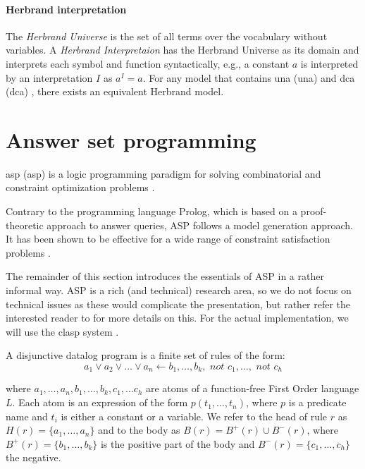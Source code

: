 \paragraph{Herbrand interpretation} The \textit{Herbrand Universe} is the set of all terms over the vocabulary without variables. A \textit{Herbrand Interpretaion} has the Herbrand Universe as its domain and interprets each symbol and function syntactically, e.g., a constant $a$ is interpreted by an interpretation $I$ as $a^I = a$. For any model that contains \acrlong{una} (\acrshort{una}) \parencite{UNA} and \acrlong{dca} (\acrshort{dca}) \parencite{DCA}, there exists an equivalent Herbrand model.


\section{Answer set programming}
\acrlong{asp} (\acrshort{asp}) is a logic programming paradigm for solving combinatorial and constraint optimization problems \parencite{whatisasp}.

Contrary to the programming language Prolog, which is based on a proof-theoretic approach to answer queries, ASP follows a model generation approach. It has been shown to be effective for a wide range of constraint satisfaction problems \parencite{ASPbook}.

The remainder of this section introduces the essentials of ASP in a rather informal way. ASP is a rich (and technical) research area, so we do not focus on technical issues as these would complicate the presentation, but rather refer the interested reader to \textcite{ASPbook,eiter,leone,whatisasp} for more details on this. For the actual implementation, we will use the clasp system \parencite{ASPbook,BrewkaCACM}.

\begin{definition}
  A disjunctive datalog program is a finite set of rules of the form: 
  \begin{equation*}
    a_1 \vee a_2 \vee \dots \vee a_n \leftarrow b_1, \dots, b_k, \textit{ not }c_1,\dots,\textit{ not }c_h 
  \end{equation*}
\end{definition}
where $a_1, \dots, a_n, b_1, \dots, b_k,c_1, \dots c_h$ are atoms of a function-free First Order language $L$. Each atom is an expression of the form $p(t_1,\ldots,t_n)$, where $p$ is a predicate name and $t_i$ is either a constant or a variable. We refer to the head of rule $r$ as $H(r) = \{a_1,\dots,a_n\}$ and to the body as $B(r) = B^{+}(r) \cup B^{-}(r)$, where $B^{+}(r) = \{ b_1, \dots, b_k \}$ is the positive part of the body and $B^{-}(r) = \{ c_1, \dots, c_h \}$ the negative. 


